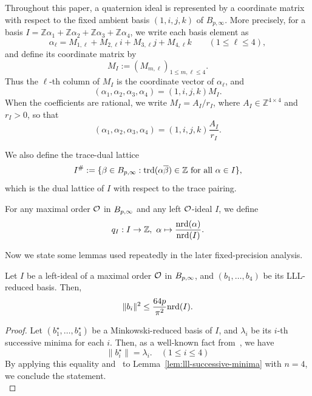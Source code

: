 Throughout this paper, a quaternion ideal is represented by a coordinate
matrix with respect to the fixed ambient basis \((1,i,j,k)\) of
\(B_{p,\infty}\). More precisely, for a basis $I=\mathbb Z\alpha_1+\mathbb Z\alpha_2+\mathbb Z\alpha_3+\mathbb Z\alpha_4$,
we write each basis element as
\[
    \alpha_\ell
    =
    M_{1,\ell}
    +M_{2,\ell}i
    +M_{3,\ell}j
    +M_{4,\ell}k
    \qquad (1\leq \ell\leq 4),
\]
and define its coordinate matrix by
\[
    M_I:=(M_{m,\ell})_{1\leq m,\ell\leq 4}.
\]
Thus the \(\ell\)-th column of \(M_I\) is the coordinate vector of
\(\alpha_\ell\), and
\[
    (\alpha_1,\alpha_2,\alpha_3,\alpha_4)
    =
    (1,i,j,k)M_I.
\]
When the coefficients are rational, we write \(M_I=A_I/r_I\), where
\(A_I\in\mathbb Z^{4\times 4}\) and \(r_I>0\), so that
\[
    (\alpha_1,\alpha_2,\alpha_3,\alpha_4)
    =
    (1,i,j,k)\frac{A_I}{r_I}.
\]

We also define the trace-dual lattice
\[
    I^\#
    :=
    \{\beta\in B_{p,\infty} :
      \operatorname{trd}(\alpha\overline{\beta})\in\mathbb Z
      \text{ for all } \alpha\in I\},
\]
which is the dual lattice of \(I\) with respect to the trace pairing.

For any maximal order $\mathcal{O}$ in $B_{p,\infty}$ and any left $\mathcal{O}$-ideal $I$, we define \[q_I: I \to \Z,\ \alpha\mapsto\frac{\nrd(\alpha)}{\nrd(I)}.\]

Now we state some lemmas used repeatedly in the later fixed-precision analysis.

\begin{lemma}
\label{lem:lll-norm}
Let $I$ be a left-ideal of a maximal order $\mathcal{O}$ in $B_{p,\infty}$, and $(b_1,\dots,b_4)$ be its LLL-reduced basis. Then,
\[ \|b_i\|^2 \le \frac{64p}{\pi^2}\mathrm{nrd}(I). \]
\end{lemma}

\begin{proof}
Let $(b_1^\star,\dots,b_4^\star)$ be a Minkowski-reduced basis of $I$, and $\lambda_i$ be its $i$-th successive minima for each $i$.
Then, as a well-known fact from~\cite{WL56}, we have
\[ \|b_i^\star\| = \lambda_i. \quad(1\le i\le4) \]
By applying this equality and~\cite[Lemma~48]{DLRW24} to Lemma~\ref{lem:lll-successive-minima} with $n=4$, we conclude the statement.\\
\end{proof}

